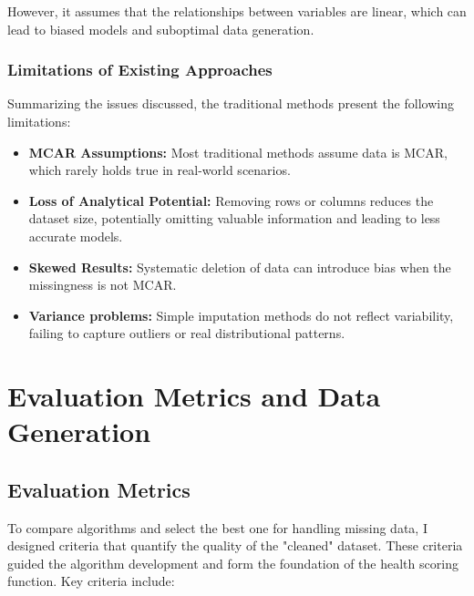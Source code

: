 \documentclass[a4paper,12pt]{article}
\begin{document}
However, it assumes that the relationships between variables are linear, which can lead to biased models and suboptimal data generation.\\

\subsubsection{Limitations of Existing Approaches}

Summarizing the issues discussed, the traditional methods present the following limitations:

\begin{itemize}
    \item \textbf{MCAR Assumptions:} Most traditional methods assume data is MCAR, which rarely holds true in real-world scenarios.
    \item \textbf{Loss of Analytical Potential:} Removing rows or columns reduces the dataset size, potentially omitting valuable information and leading to less accurate models.
    \item \textbf{Skewed Results:} Systematic deletion of data can introduce bias when the missingness is not MCAR.
    \item \textbf{Variance problems:} Simple imputation methods do not reflect variability, failing to capture outliers or real distributional patterns.
\end{itemize}

\newpage
\section{Evaluation Metrics and Data Generation}

\subsection{Evaluation Metrics}
To compare algorithms and select the best one for handling missing data, I designed criteria that quantify the quality of the "cleaned" dataset. These criteria guided the algorithm development and form the foundation of the health scoring function. Key criteria include:
\end{document}
